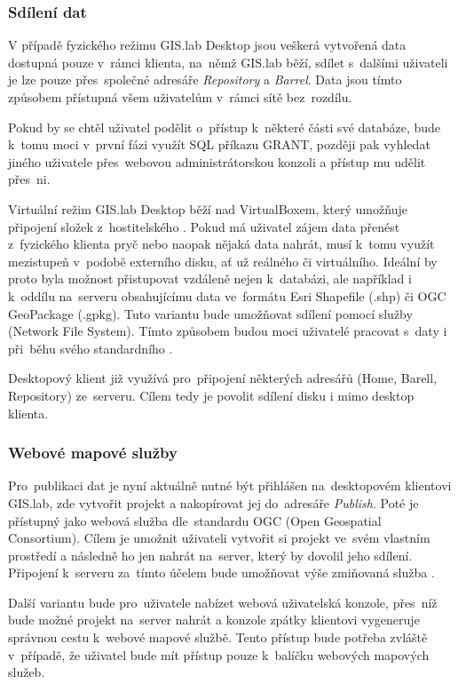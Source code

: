 \subsubsection{Sdílení dat}
V případě fyzického režimu GIS.lab Desktop jsou veškerá vytvořená data
dostupná pouze v~rámci klienta, na~němž GIS.lab běží, sdílet s~dalšími
uživateli je lze pouze přes~společné adresáře \textit{Repository} a
\textit{Barrel}. Data jsou tímto způsobem přístupná všem uživatelům v~rámci 
sítě bez~rozdílu.

Pokud by se chtěl uživatel podělit o~přístup k~některé části své
databáze, bude k~tomu moci v~první fázi využít SQL příkazu GRANT,
později pak vyhledat jiného uživatele přes~webovou administrátorskou
konzoli a přístup mu udělit přes~ni.

Virtuální režim GIS.lab Desktop běží nad VirtualBoxem, který umožňuje 
připojení složek z~hostitelského . Pokud má uživatel zájem data 
přenést z~fyzic\-kého klienta pryč nebo naopak nějaká
data nahrát, musí k~tomu využít mezistupeň v~podobě externího disku,
ať už reálného či virtuálního. Ideální by proto byla možnost
přistupovat vzdáleně nejen k~databázi, ale například i k~oddílu na~serveru 
obsahujícímu data ve~formátu Esri Shapefile (.shp) či OGC
GeoPackage (.gpkg). Tuto variantu bude umožňovat sdílení pomocí služby
 (Network File System). Tímto způsobem budou moci uživatelé
pracovat s~daty i při~běhu svého standardního .

Desktopový klient již  využívá pro~připojení některých adresářů 
(Home, Barell, Repository) ze~serveru. Cílem tedy je povolit sdílení 
disku i mimo desktop klienta.

\subsubsection{Webové mapové služby}
Pro~publikaci dat je nyní aktuálně nutné být přihlášen na~desktopovém
klientovi GIS.lab, zde vytvořit projekt a nakopírovat jej do~adresáře
\textit{Publish}. Poté je přístupný jako webová služba dle~standardu
OGC (Open Geospatial Consortium). Cílem je umožnit uživateli vytvořit
si projekt ve~svém vlastním prostředí a následně ho jen nahrát na~server, 
který by dovolil jeho sdílení. Připojení k~serveru za~tímto
účelem bude umožňovat výše zmiňovaná služba .

Další variantu bude pro~uživatele nabízet webová uživatelská konzole,
přes~níž bude možné projekt na~server nahrát a konzole zpátky
klientovi vygeneruje správnou cestu k~webové mapové službě. Tento
přístup bude potřeba zvláště v~případě, že uživatel bude mít přístup
pouze k~balíčku webových mapových služeb.

